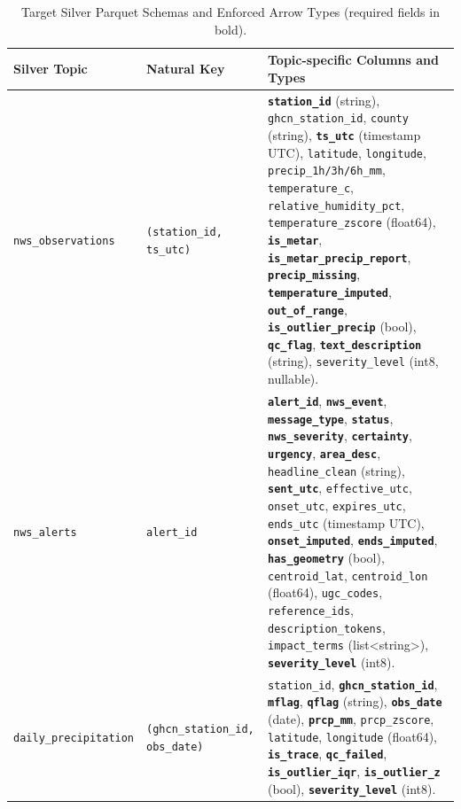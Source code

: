 \documentclass[stu, 12pt, letterpaper, donotrepeattitle, floatsintext, natbib]{apa7}
\begin{document}
\begin{table}[H]
\centering
\scriptsize
\caption{Target Silver Parquet Schemas and Enforced Arrow Types (required fields in bold).}
\label{tab:silver_schemas}
\begin{tabularx}{\textwidth}{>{\raggedright\arraybackslash}p{3.0cm} >{\raggedright\arraybackslash}p{2.6cm} >{\raggedright\arraybackslash}X}
\toprule
\textbf{Silver Topic} & \textbf{Natural Key} & \textbf{Topic-specific Columns and Types} \\
\midrule
\texttt{nws\_observations} & \texttt{(station\_id, ts\_utc)} & \textbf{\texttt{station\_id}} (string), \texttt{ghcn\_station\_id}, \texttt{county} (string), \textbf{\texttt{ts\_utc}} (timestamp UTC), \texttt{latitude}, \texttt{longitude}, \texttt{precip\_1h/3h/6h\_mm}, \texttt{temperature\_c}, \texttt{relative\_humidity\_pct}, \texttt{temperature\_zscore} (float64), \textbf{\texttt{is\_metar}}, \textbf{\texttt{is\_metar\_precip\_report}}, \textbf{\texttt{precip\_missing}}, \textbf{\texttt{temperature\_imputed}}, \textbf{\texttt{out\_of\_range}}, \textbf{\texttt{is\_outlier\_precip}} (bool), \textbf{\texttt{qc\_flag}}, \textbf{\texttt{text\_description}} (string), \texttt{severity\_level} (int8, nullable). \\
\addlinespace
\texttt{nws\_alerts} & \texttt{alert\_id} & \textbf{\texttt{alert\_id}}, \textbf{\texttt{nws\_event}}, \textbf{\texttt{message\_type}}, \textbf{\texttt{status}}, \textbf{\texttt{nws\_severity}}, \textbf{\texttt{certainty}}, \textbf{\texttt{urgency}}, \textbf{\texttt{area\_desc}}, \texttt{headline\_clean} (string), \textbf{\texttt{sent\_utc}}, \texttt{effective\_utc}, \texttt{onset\_utc}, \texttt{expires\_utc}, \texttt{ends\_utc} (timestamp UTC), \textbf{\texttt{onset\_imputed}}, \textbf{\texttt{ends\_imputed}}, \textbf{\texttt{has\_geometry}} (bool), \texttt{centroid\_lat}, \texttt{centroid\_lon} (float64), \texttt{ugc\_codes}, \texttt{reference\_ids}, \texttt{description\_tokens}, \texttt{impact\_terms} (list<string>), \textbf{\texttt{severity\_level}} (int8). \\
\addlinespace
\texttt{daily\_precipitation} & \texttt{(ghcn\_station\_id, obs\_date)} & \texttt{station\_id}, \textbf{\texttt{ghcn\_station\_id}}, \textbf{\texttt{mflag}}, \textbf{\texttt{qflag}} (string), \textbf{\texttt{obs\_date}} (date), \textbf{\texttt{prcp\_mm}}, \texttt{prcp\_zscore}, \texttt{latitude}, \texttt{longitude} (float64), \textbf{\texttt{is\_trace}}, \textbf{\texttt{qc\_failed}}, \textbf{\texttt{is\_outlier\_iqr}}, \textbf{\texttt{is\_outlier\_z}} (bool), \textbf{\texttt{severity\_level}} (int8). \\

\end{tabularx}
\end{table}
\end{document}

